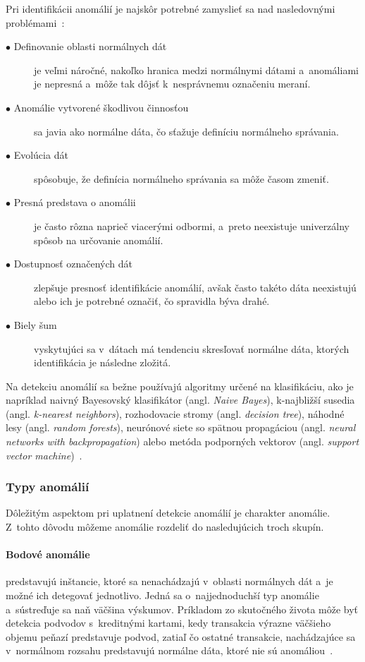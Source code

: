 \documentclass[a4paper,twoside,slovak,12pt,appendix]{article}
\begin{document}
Pri identifikácii anomálií je najskôr potrebné zamyslieť sa nad nasledovnými
problémami~\cite{Chandola2009}:
\begin{description}
	\item[$\bullet$ Definovanie oblasti normálnych dát] je veľmi náročné, nakoľko
	hranica medzi normálnymi dátami a~anomáliami je nepresná a~môže tak dôjsť
	k~nesprávnemu označeniu meraní.
	\item[$\bullet$ Anomálie vytvorené škodlivou činnosťou] sa javia ako normálne
	dáta, čo sťažuje definíciu normálneho správania.
	\item[$\bullet$ Evolúcia dát] spôsobuje, že definícia normálneho správania sa
	môže časom zmeniť.
	\item[$\bullet$ Presná predstava o anomálii] je často rôzna naprieč viacerými
	odbormi, a~preto neexistuje univerzálny spôsob na určovanie anomálií.
	\item[$\bullet$ Dostupnosť označených dát] zlepšuje presnosť identifikácie
	anomálií, avšak často takéto dáta neexistujú alebo ich je potrebné označiť,
	čo spravidla býva drahé.
	\item[$\bullet$ Biely šum] vyskytujúci sa v~dátach má tendenciu skresľovať
	normálne dáta, ktorých identifikácia je následne zložitá.
\end{description}

Na detekciu anomálií sa bežne používajú algoritmy určené na klasifikáciu, ako je
napríklad naivný Bayesovský klasifikátor (angl. \textit{Naive Bayes}),
k-najbližší susedia (angl. \textit{k-nearest neighbors}), rozhodovacie stromy
(angl. \textit{decision tree}), náhodné lesy (angl. \textit{random forests}),
neurónové siete so spätnou propagáciou (angl. \textit{neural networks with
backpropagation}) alebo metóda podporných vektorov (angl. \textit{support vector
machine})~\cite{Coma-Puig2016}.


\subsubsection{Typy anomálií}
Dôležitým aspektom pri uplatnení detekcie anomálií je charakter anomálie.
Z~tohto dôvodu môžeme anomálie rozdeliť do nasledujúcich troch skupín.

\paragraph{Bodové anomálie} predstavujú inštancie, ktoré sa nenachádzajú
v~oblasti normálnych dát a~je možné ich detegovať jednotlivo. Jedná sa
o~najjednoduchší typ anomálie a~sústreďuje sa naň väčšina výskumov. Príkladom zo
skutočného života môže byť detekcia podvodov s~kreditnými kartami, kedy
transakcia výrazne väčšieho objemu peňazí predstavuje podvod, zatiaľ čo ostatné
transakcie, nachádzajúce sa v~normálnom rozsahu predstavujú normálne dáta, ktoré
nie sú anomáliou~\cite{Chandola2009}.
\end{document}

